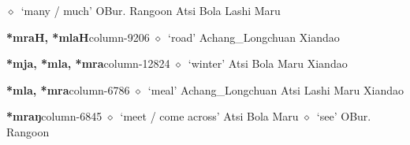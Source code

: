 \hspace{1ex}
         $\diamond$~`many / much'
         OBur. 
\hspace{1ex}
         Rangoon 
\hspace{1ex}
         Atsi 
\hspace{1ex}
         Bola 
\hspace{1ex}
         Lashi 
\hspace{1ex}
         Maru 
  \item {\footnotesize \textbf{*mraH, *mlaH}}{\tiny column-9206}
         $\diamond$~`road'
         Achang\_Longchuan 
\hspace{1ex}
         Xiandao 
  \item {\footnotesize \textbf{*mja, *mla, *mra}}{\tiny column-12824}
         $\diamond$~`winter'
         Atsi 
\hspace{1ex}
         Bola 
\hspace{1ex}
         Maru 
\hspace{1ex}
         Xiandao 
  \item {\footnotesize \textbf{*mla, *mra}}{\tiny column-6786}
         $\diamond$~`meal'
         Achang\_Longchuan 
\hspace{1ex}
         Atsi 
\hspace{1ex}
         Lashi 
\hspace{1ex}
         Maru 
\hspace{1ex}
         Xiandao 
  \item {\footnotesize \textbf{*mraŋ}}{\tiny column-6845}
         $\diamond$~`meet / come across'
         Atsi 
\hspace{1ex}
         Bola 
\hspace{1ex}
         Maru 
\hspace{1ex}
         $\diamond$~`see'
         OBur. 
\hspace{1ex}
         Rangoon 
